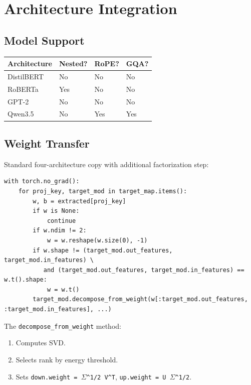 
\section{Architecture Integration}

\subsection{Model Support}

\begin{table}[H]
\centering
\small
\begin{tabular}{llll}
\toprule
\textbf{Architecture} & \textbf{Nested?} & \textbf{RoPE?} & \textbf{GQA?} \\
\midrule
DistilBERT & No & No & No \\
RoBERTa & Yes & No & No \\
GPT-2 & No & No & No \\
Qwen3.5 & No & Yes & Yes \\
\bottomrule
\end{tabular}
\end{table}

\subsection{Weight Transfer}

Standard four-architecture copy with additional factorization step:

\begin{lstlisting}
with torch.no_grad():
    for proj_key, target_mod in target_map.items():
        w, b = extracted[proj_key]
        if w is None:
            continue
        if w.ndim != 2:
            w = w.reshape(w.size(0), -1)
        if w.shape != (target_mod.out_features, target_mod.in_features) \
           and (target_mod.out_features, target_mod.in_features) == w.t().shape:
            w = w.t()
        target_mod.decompose_from_weight(w[:target_mod.out_features, :target_mod.in_features], ...)
\end{lstlisting}

The \texttt{decompose\_from\_weight} method:
\begin{enumerate}
\item Computes SVD.
\item Selects rank by energy threshold.
\item Sets \texttt{down.weight = $\Sigma$\^{}{1/2} V\^{}T}, \texttt{up.weight = U $\Sigma$\^{}{1/2}}.

\end{enumerate}
